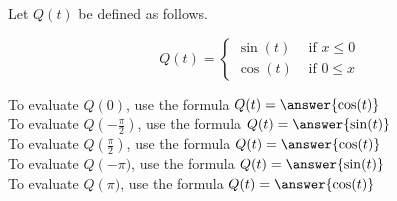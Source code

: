 \documentclass{ximera}
\author{Lee Wayand}
\begin{document}
\begin{exercise}




Let $Q(t)$ be defined as follows.

\[
Q(t) = 
\begin{cases}
  \sin(t) & \text{ if }  x \le 0 \\
  \cos(t) & \text{ if } 0 \leq x 
\end{cases}
\]



To evaluate $Q(0)$, use the formula $Q(t) = \answer{\cos(t)}$ \\


To evaluate $Q\left( -\frac{\pi}{2} \right)$, use the formula $Q(t) = \answer{\sin(t)}$ \\


To evaluate $Q\left( \frac{\pi}{2} \right)$, use the formula $Q(t) = \answer{\cos(t)}$ \\


To evaluate $Q\left(-\pi)$, use the formula $Q(t) = \answer{\sin(t)}$ \\


To evaluate $Q\left(\pi)$, use the formula $Q(t) = \answer{\cos(t)}$ \\




\end{exercise}
\end{document}
